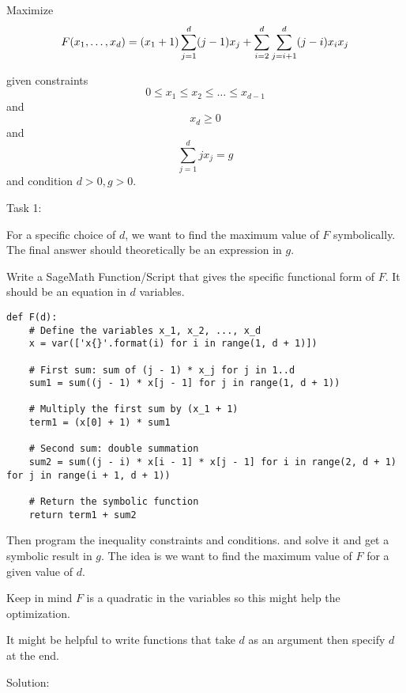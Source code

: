 \documentclass[11pt]{article}
\title{}
\author{Erik Imathiu-Jones}
\begin{document}
Maximize
\[F(x_1, \dots, x_{d}) = (x_1 + 1)\sum\limits_{j=1}^{d} (j - 1) x_j + \sum\limits_{i = 2}^d\limits\sum\limits_{j=i+1}^d (j - i) x_i x_j\]

given constraints \[0 \le x_1 \le x_2 \le \dots \le x_{d -1}\] and \[x_d \ge 0\] \iffalse and \[1 + \sum\limits_{j = 1}^d x_j = m\]\fi and \[\sum\limits_{j=1}^d j x_j = g\] and condition \(d > 0, g > 0\).

Task 1:

For a specific choice of \(d\), we want to find the maximum value of \(F\) symbolically. The final answer should theoretically be an expression in \(g\).

Write a SageMath Function/Script that gives the specific functional form of \(F\). It should be an equation in \(d\) variables. 

\begin{lstlisting}[style=Sage]
def F(d):
    # Define the variables x_1, x_2, ..., x_d
    x = var(['x{}'.format(i) for i in range(1, d + 1)])
    
    # First sum: sum of (j - 1) * x_j for j in 1..d
    sum1 = sum((j - 1) * x[j - 1] for j in range(1, d + 1))
    
    # Multiply the first sum by (x_1 + 1)
    term1 = (x[0] + 1) * sum1
    
    # Second sum: double summation
    sum2 = sum((j - i) * x[i - 1] * x[j - 1] for i in range(2, d + 1) for j in range(i + 1, d + 1))
    
    # Return the symbolic function
    return term1 + sum2
\end{lstlisting}

Then program the inequality constraints and conditions. and solve it and get a symbolic result in \(g\). The idea is we want to find the maximum value of \(F\) for a given value of \(d\). 

Keep in mind \(F\) is a quadratic in the variables so this might help the optimization.

It might be helpful to write functions that take \(d\) as an argument then specify \(d\) at the end.


Solution:
\end{document}
